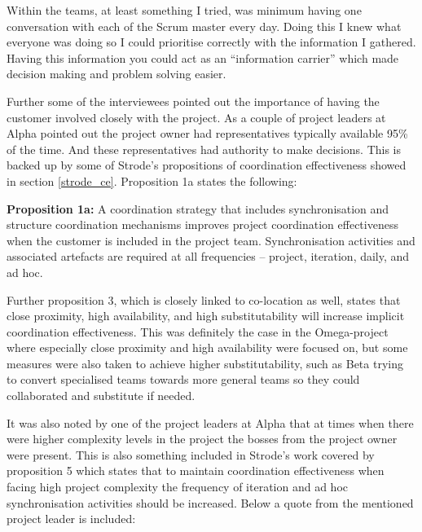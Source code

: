 \begin{fancyquotes}
Within the teams, at least something I tried, was minimum having one conversation with each of the Scrum master every day. Doing this I knew what everyone was doing so I could prioritise correctly with the information I gathered. Having this information you could act as an ``information carrier'' which made decision making and problem solving easier.
\end{fancyquotes}

Further some of the interviewees pointed out the importance of having the customer involved closely with the project. As a couple of project leaders at Alpha pointed out the project owner had representatives typically available 95\% of the time. And these representatives had authority to make decisions. This is backed up by some of Strode's \cite{Strode2012} propositions of coordination effectiveness showed in section \ref{strode_ce}. Proposition 1a states the following:

\begin{fancyquotes}
\textbf{Proposition 1a:} A coordination strategy that includes synchronisation and structure coordination mechanisms improves project coordination effectiveness when the customer is included in the project team. Synchronisation activities and associated artefacts are required at all frequencies – project, iteration, daily, and ad hoc.
\end{fancyquotes}

Further proposition 3, which is closely linked to co-location as well, states that close proximity, high availability, and high substitutability will increase implicit coordination effectiveness. This was definitely the case in the Omega-project where especially close proximity and high availability were focused on, but some measures were also taken to achieve higher substitutability, such as Beta trying to convert specialised teams towards more general teams so they could collaborated and substitute if needed.

It was also noted by one of the project leaders at Alpha that at times when there were higher complexity levels in the project the bosses from the project owner were present. This is also something included in Strode's work covered by proposition 5 which states that to maintain coordination effectiveness when facing high project complexity the frequency of iteration and ad hoc synchronisation activities should be increased. Below a quote from the mentioned project leader is included:

